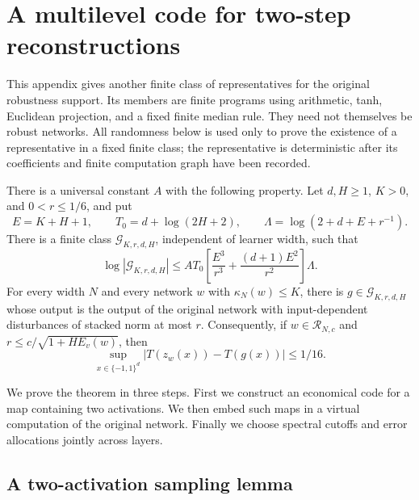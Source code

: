 \section{A multilevel code for two-step reconstructions}
\label{app:mlmc-code}

This appendix gives another finite class of representatives for the
original robustness support. Its members are finite programs using
arithmetic, tanh, Euclidean projection, and a fixed finite median rule.
They need not themselves be robust networks. All randomness below is
used only to prove the existence of a representative in a fixed finite
class; the representative is deterministic after its coefficients and
finite computation graph have been recorded.

\begin{theorem}
\label{thm:mlmc-code}
There is a universal constant $A$ with the following property. Let
$d,H\ge1$, $K>0$, and $0<r\le1/6$, and put
\[
 E=K+H+1,\qquad
 T_0=d+\log(2H+2),\qquad
 \Lambda=\log(2+d+E+r^{-1}).
\]
There is a finite class $\mathcal G_{K,r,d,H}$, independent of learner
width, such that
\begin{equation}\label{eq:mlmc-budget}
 \log|\mathcal G_{K,r,d,H}|
 \le A T_0\left[\frac{E^3}{r^3}
                  +\frac{(d+1)E^2}{r^2}\right]\Lambda.
\end{equation}
For every width $N$ and every network $w$ with $\kappa_N(w)\le K$,
there is $g\in\mathcal G_{K,r,d,H}$ whose output is the output of the
original network with input-dependent disturbances of stacked norm at
most $r$. Consequently, if $w\in\mathcal R_{N,c}$ and
$r\le c/\sqrt{1+HE_v(w)}$, then
\[
 \sup_{x\in\{-1,1\}^d}|T(z_w(x))-T(g(x))|\le1/16.
\]
\end{theorem}

We prove the theorem in three steps. First we construct an economical
code for a map containing two activations. We then embed such maps in
a virtual computation of the original network. Finally we choose
spectral cutoffs and error allocations jointly across layers.

\subsection{A two-activation sampling lemma}

